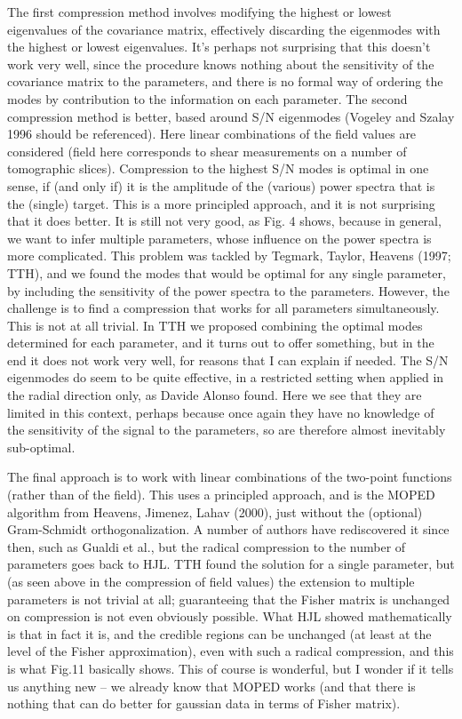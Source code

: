 \documentclass{article}
\begin{document}
	The first compression method involves modifying the highest or lowest eigenvalues of the covariance matrix, effectively discarding the eigenmodes with the highest or lowest eigenvalues.  It’s perhaps not surprising that this doesn’t work very well, since the procedure knows nothing about the sensitivity of the covariance matrix to the parameters, and there is no formal way of ordering the modes by contribution to the information on each parameter. 
	The second compression method is better, based around S/N eigenmodes (Vogeley and Szalay 1996 should be referenced). Here linear combinations of the field values are considered (field here corresponds to shear measurements on a number of tomographic slices). Compression to the highest S/N modes is optimal in one sense, if (and only if) it is the amplitude of the (various) power spectra that is the (single) target.  This is a more principled approach, and it is not surprising that it does better.  It is still not very good, as Fig. 4 shows, because in general, we want to infer multiple parameters, whose influence on the power spectra is more complicated.  This problem was tackled by Tegmark, Taylor, Heavens (1997;  TTH), and we found the modes that would be optimal for any single parameter, by including the sensitivity of the power spectra to the parameters. However, the challenge is to find a compression that works for all parameters simultaneously.  This is not at all trivial. In TTH we proposed combining the optimal modes determined for each parameter, and it turns out to offer something, but in the end it does not work very well, for reasons that I can explain if needed.   The S/N eigenmodes do seem to be quite effective, in a restricted setting when applied in the radial direction only, as Davide Alonso found.  Here we see that they are limited in this context, perhaps because once again they have no knowledge of the sensitivity of the signal to the parameters, so are therefore almost inevitably sub-optimal.
	
	The final approach is to work with linear combinations of the two-point functions (rather than of the field).  This uses a principled approach, and is the MOPED algorithm from Heavens, Jimenez, Lahav (2000), just without the (optional) Gram-Schmidt orthogonalization.  A number of authors have rediscovered it since then, such as Gualdi et al., but the radical compression to the number of parameters goes back to HJL.  TTH found the solution for a single parameter, but (as seen above in the compression of field values) the extension to multiple parameters is not trivial at all; guaranteeing that the Fisher matrix is unchanged on compression is not even obviously possible.  What HJL showed mathematically is that in fact it is, and the credible regions can be unchanged (at least at the level of the Fisher approximation), even with such a radical compression, and this is what Fig.11 basically shows.  This of course is wonderful, but I wonder if it tells us anything new – we already know that MOPED works (and that there is nothing that can do better for gaussian data in terms of Fisher matrix).
	
\end{document}
